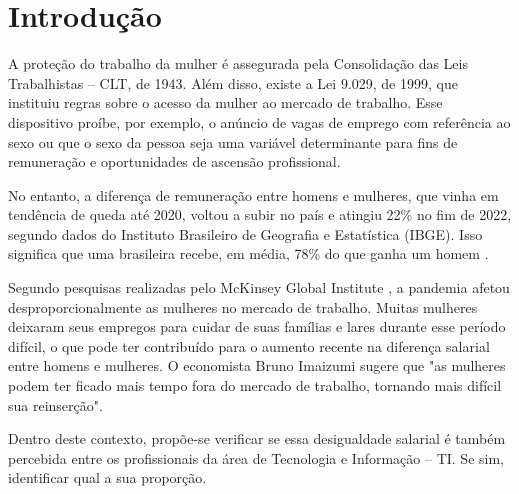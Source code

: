 \section{Introdução}

A proteção do trabalho da mulher é assegurada pela Consolidação das Leis Trabalhistas – CLT, de 1943. Além disso, existe a Lei 9.029, de 1999, que instituiu regras sobre o acesso da mulher ao mercado de trabalho. Esse dispositivo proíbe, por exemplo, o anúncio de vagas de emprego com referência ao sexo ou que o sexo da pessoa seja uma variável determinante para fins de remuneração e oportunidades de ascensão profissional. 

No entanto, a diferença de remuneração entre homens e mulheres, que vinha em tendência de queda até 2020, voltou a subir no país e atingiu 22\% no fim de 2022, segundo dados do Instituto Brasileiro de Geografia e Estatística (IBGE). Isso significa que uma brasileira recebe, em média, 78\% do que ganha um homem \cite{dif_salarial_CNN}.

Segundo pesquisas realizadas pelo McKinsey Global Institute  \cite{covid_affeted_gender}, a pandemia afetou desproporcionalmente as mulheres no mercado de trabalho. Muitas mulheres deixaram seus empregos para cuidar de suas famílias e lares durante esse período difícil, o que pode ter contribuído para o aumento recente na diferença salarial entre homens e mulheres. O economista Bruno Imaizumi sugere que "as mulheres podem ter ficado mais tempo fora do mercado de trabalho, tornando mais difícil sua reinserção".

Dentro deste contexto, propõe-se verificar se essa desigualdade salarial é também percebida entre os profissionais da área de Tecnologia e Informação – TI. Se sim, identificar qual a sua proporção.
